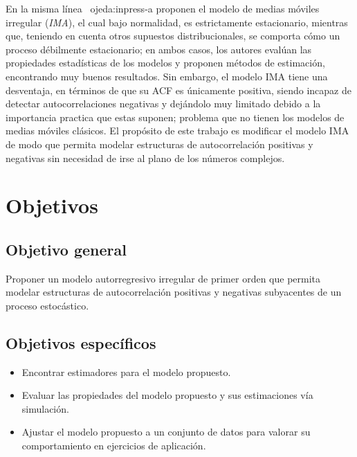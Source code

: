  
 
En la misma línea \ {ojeda:inpress-a} proponen el modelo de medias móviles irregular (\emph{IMA}), el cual bajo normalidad,
es estrictamente estacionario, mientras que, teniendo en cuenta otros 
supuestos distribucionales, se comporta cómo un proceso débilmente 
estacionario; en ambos casos, los autores evalúan las propiedades
estadísticas de los modelos y proponen métodos de estimación, 
encontrando muy buenos resultados. Sin embargo, el modelo IMA 
tiene una desventaja, en términos de que su ACF es únicamente 
positiva, siendo incapaz de detectar autocorrelaciones negativas 
y dejándolo muy limitado debido a la importancia practica que estas 
suponen; problema que no tienen los modelos de medias móviles clásicos.
El propósito de este trabajo es modificar el modelo IMA de modo que 
permita modelar estructuras de autocorrelación positivas y negativas
sin necesidad de irse al plano de los números complejos.
 
\section{Objetivos}
\subsection{Objetivo general}
Proponer un modelo autorregresivo irregular de primer orden que 
permita modelar estructuras de autocorrelación positivas y negativas
subyacentes de un proceso estocástico.
\subsection{Objetivos específicos}
\begin{itemize}
    \item Encontrar estimadores para el modelo propuesto.
    \item Evaluar las propiedades del modelo propuesto y sus estimaciones vía simulación.
    \item Ajustar el modelo propuesto a un conjunto de datos para valorar su comportamiento en ejercicios de aplicación.
\end{itemize}